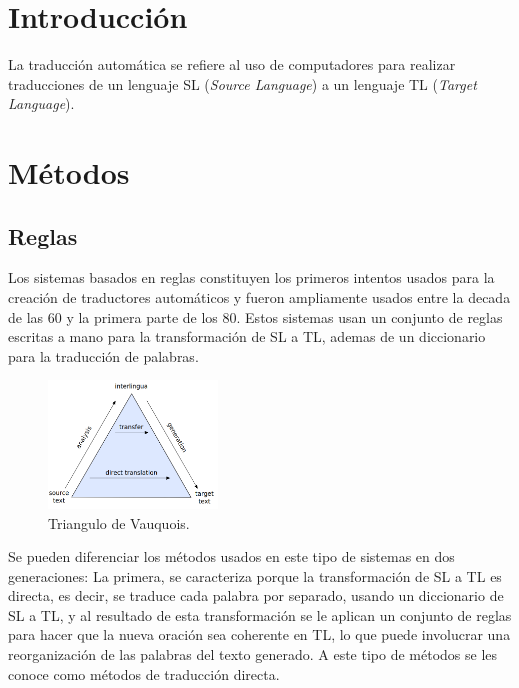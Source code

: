 \documentclass[12pt, letterpaper]{article}
\begin{document}
    \begin{multicols}{2}
        \section{Introducción}
            La traducción automática se refiere al uso de computadores para realizar traducciones
            de un lenguaje SL (\textit{Source Language}) a un lenguaje TL (\textit{Target Language}).
        \section{Métodos}
            \subsection{Reglas}
                Los sistemas basados en reglas constituyen los primeros intentos usados para la creación
                de traductores automáticos y fueron ampliamente usados entre la decada de las 60 y la 
                primera parte de los 80. Estos sistemas usan un conjunto de reglas escritas a mano para la
                transformación de SL a TL, ademas de un diccionario para la traducción de palabras. 

                \begin{figure}[H]
                    \centering
                    \includegraphics[width=0.4\textwidth]{triangle.png}
                    \caption[]{Triangulo de Vauquois.}
                    \label{triangle}
                \end{figure}
                
                
                Se pueden diferenciar los métodos usados en este tipo de sistemas en dos generaciones\cite{HUTCHINS1995431}:
                La primera, se caracteriza porque la transformación de SL a TL es directa, es decir, se traduce
                cada palabra por separado, usando un diccionario de SL a TL, y al resultado de esta transformación
                se le aplican un conjunto de reglas para hacer que la nueva oración sea coherente en TL, lo que 
                puede involucrar una reorganización de las palabras del texto generado. A este tipo de métodos se 
                les conoce como métodos de traducción directa.


\end{multicols}
\end{document}

